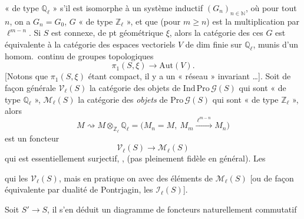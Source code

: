 \documentclass[11pt,a4paper]{article}
\begin{document}
« de type $\mathbb{Q}_{\ell}$ » s'il est isomorphe à un \struck{\ill{}}
système inductif $(G_{n})_{n \in \mathbb{N}}$, où pour tout $n$, on a
$G_{n} = G_{0}$, $G$  « de type 
$\mathbb{Z}_{\ell}$ », et que  (pour $m
\geqslant n$) est la multiplication par $\ell^{m-n}$. Si $S$ est connexe,
de pt géométrique $\xi$, alors la catégorie des ces $G$ est équivalente à
la catégorie des espaces vectoriels $V$ de dim finie sur
$\mathbb{Q}_{\ell}$, munis d'un homom.\ continu de groupes topologiques
\[
\pi_{1}(S, \xi) \longrightarrow \mathrm{Aut}(V).
\]
[Notons que $\pi_{1}(S, \xi)$ étant compact, il y a \ill{} un « réseau »
invariant \ldots]. Soit de façon générale $\mathcal{V}_{\ell}(S)$ la
catégorie des objets de $\mathrm{Ind}\,\mathrm{Pro}\,\mathcal{G}(S)$ qui
sont « de type $\mathbb{Q}_{\ell}$ », $\mathcal{M}_{\ell}(S)$ la catégorie
des \emph{objets} de $\mathrm{Pro}\,\mathcal{G}(S)$ qui sont « de type
$\mathbb{Z}_{\ell}$ »,  \struck{\ill{}} alors
\[
M \rightsquigarrow M \otimes_{\mathbb{Z}_{\ell}} \mathbb{Q}_{\ell} = \bigl(M_{n} = M,\ M_{m} \xrightarrow{\ \ell^{m-n}\ } M_{n}\bigr)
\]
est un foncteur
\[
\mathcal{V}_{\ell}(S) \longrightarrow \mathcal{M}_{\ell}(S)
\]
qui est essentiellement surjectif, , (pas pleinement
fidèle en général). Les

\ill{} qui \ill{} \ill{}   les
$\mathcal{V}_{\ell}(S)$, mais en pratique on 
 avec des éléments de $\mathcal{M}_{\ell}(S)$ [ou de façon
équivalente par dualité de Pontrjagin, les $\mathcal{I}_{\ell}(S)$].

Soit $S' \to S$, il s'en déduit un diagramme de foncteurs naturellement
commutatif

\end{document}
